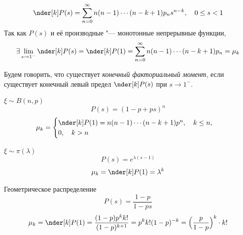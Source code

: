 $$ \nder[k]P(s) = \sum_{n = 0}^\infty n (n - 1) \cdots (n - k + 1) p_ns^{n - k}, \quad 0 \le s < 1 $$
Так как $ P(s) $ и её производные "--- монотонные непрерывные функции,
$$ \exists \lim\limits_{s \to 1^-} \nder[k]P(s) = \nder[k]P(1) =
\sum_{n = 0}^\infty n (n - 1) \cdots (n - k + 1)p_n = \mu_k $$

Будем говорить, что существует \emph{конечный факториальный момент}, если существует конечный левый
предел $ \nder[k]P(s) $ при $ s \to 1^- $.

\begin{exmpls}
\item $ \xi \sim B(n, p) $
	$$ P(s) = (1 - p + ps)^n $$
	$$ \mu_k =
	\begin{cases}
		\nder[k]P(1) = n(n - 1) \cdots (n - k + 1)p^n, \quad k \le n, \\
		0, \quad k > n
	\end{cases} $$
\item $ \xi \sim \pi(\lambda) $
	$$ P(s) = e^{\lambda(s - 1)} $$
	$$ \mu_k = \nder[k]P(1) = \lambda^k $$
\item Геометрическое распределение
	$$ P(s) = \frac{1 - p}{1 - ps} $$
	$$ \mu_k = \nder[k]P(1) = \frac{(1 - p)p^k k!}{(1 - p)^{k + 1}} = p^k k! (1 - p)^{-k} =
	\Bigl( \frac{p}{1 - p} \Bigr)^k \cdot k! $$
\end{exmpls}
